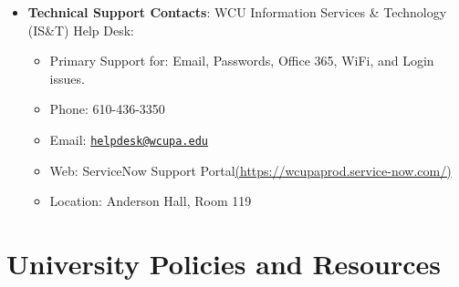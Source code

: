 \documentclass[
]{article}
\providecommand{\tightlist}{%
  \setlength{\itemsep}{0pt}\setlength{\parskip}{0pt}}
\begin{document}
\begin{itemize}
  \begin{itemize}
  \tightlist
  \item
    \textbf{Hardware}: Access to a modern desktop or laptop computer
    (Windows 10/11 or macOS 11+) with a working webcam and microphone is
    required. Chromebooks, iPads, and mobile devices are not fully
    compatible with all WCU systems and should not be relied upon as a
    primary device.\\
  \item
    \textbf{Internet}: A reliable, high-speed broadband internet
    connection is required.\\
  \item
    \textbf{Software}: Microsoft Office 365: West Chester University
    provides Microsoft Office 365 (Word, Excel, PowerPoint, etc.) to all
    active students at no cost. You can install these applications on up
    to five personal devices by logging into
    office.com\href{https://www.office.com/}{(https://www.office.com/)}
    with your WCU credentials and clicking ``Install Office.''\\
  \item
    \textbf{Web Browser}: Google Chrome or Mozilla Firefox are the
    preferred browsers for D2L.\\
  \item
    \textbf{PDF Reader}: Adobe Acrobat Reader (free version) or similar.
  \end{itemize}
\item
  \textbf{Technical Support Contacts}: WCU Information Services \&
  Technology (IS\&T) Help Desk:

  \begin{itemize}
  \tightlist
  \item
    Primary Support for: Email, Passwords, Office 365, WiFi, and Login
    issues.
  \item
    Phone: 610-436-3350
  \item
    Email:
    \href{mailto:helpdesk@wcupa.edu}{\nolinkurl{helpdesk@wcupa.edu}}
  \item
    Web: ServiceNow Support
    Portal\href{https://wcupaprod.service-now.com/}{(https://wcupaprod.service-now.com/)}
  \item
    Location: Anderson Hall, Room 119
  \end{itemize}
\end{itemize}

\hypertarget{university-policies-and-resources}{%
\section{University Policies and
Resources}\label{university-policies-and-resources}}
\end{document}

